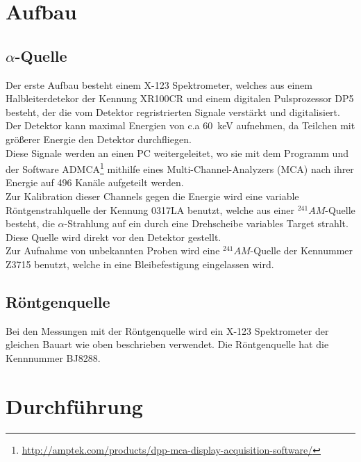 \documentclass[12pt,a4paper]{article}
\begin{document}
\section{Aufbau}
\subsection{$\alpha$-Quelle}
Der erste Aufbau besteht einem X-123 Spektrometer, welches aus einem Halbleiterdetekor der Kennung XR100CR und einem digitalen Pulsprozessor DP5 besteht, der die vom Detektor regristrierten Signale verstärkt und digitalisiert. Der Detektor kann maximal Energien von c.a \SI{60}{keV} aufnehmen, da Teilchen mit größerer Energie den Detektor durchfliegen.\\
Diese Signale werden an einen PC weitergeleitet, wo sie mit dem Programm und der Software ADMCA\footnote{\url{http://amptek.com/products/dpp-mca-display-acquisition-software/}} mithilfe eines Multi-Channel-Analyzers (MCA) nach ihrer Energie auf 496 Kanäle aufgeteilt werden.\\
Zur Kalibration dieser Channels gegen die Energie wird eine variable Röntgenstrahlquelle der Kennung 0317LA benutzt, welche aus einer $^{241}AM$-Quelle besteht, die $\alpha$-Strahlung auf ein durch eine Drehscheibe variables Target strahlt. Diese Quelle wird direkt vor den Detektor gestellt.\\
Zur Aufnahme von unbekannten Proben wird eine $^{241}AM$-Quelle der Kennummer Z3715 benutzt, welche in eine Bleibefestigung eingelassen wird.
\subsection{Röntgenquelle}
Bei den Messungen mit der Röntgenquelle wird ein X-123 Spektrometer der gleichen Bauart wie oben beschrieben verwendet. Die Röntgenquelle hat die Kennnummer BJ8288.
\section{Durchführung}
\end{document}
